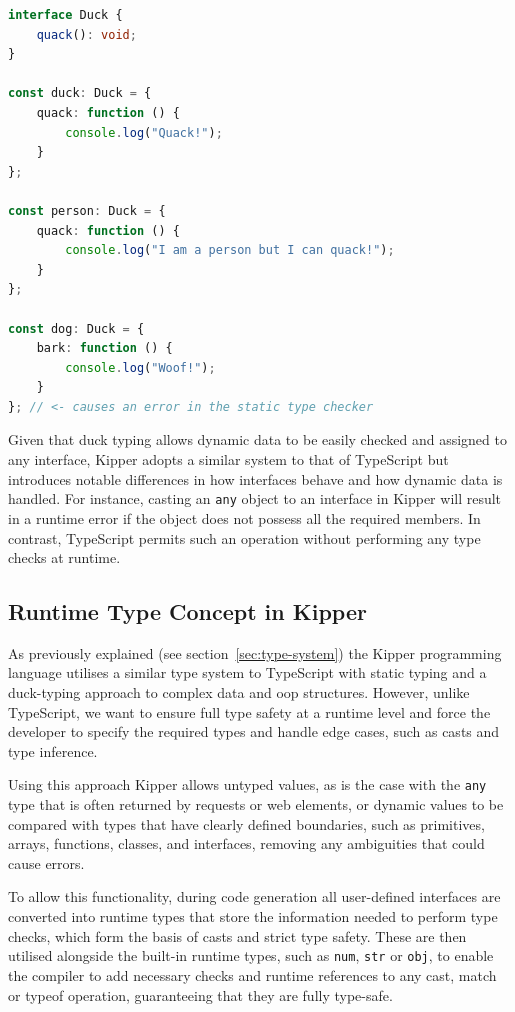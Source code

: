 \begin{lstlisting}[language=Typescript,caption=Example of duck typing in TypeScript,label=lst:implementation:javascriptducktyping]
interface Duck {
	quack(): void;
}

const duck: Duck = {
	quack: function () {
		console.log("Quack!");
	}
};

const person: Duck = {
	quack: function () {
		console.log("I am a person but I can quack!");
	}
};

const dog: Duck = {
	bark: function () {
		console.log("Woof!");
	}
}; // <- causes an error in the static type checker
\end{lstlisting}

Given that duck typing allows dynamic data to be easily checked and assigned to any interface, Kipper adopts a similar system to that of TypeScript but introduces notable differences in how interfaces behave and how dynamic data is handled. For instance, casting an \lstinline|any| object to an interface in Kipper will result in a runtime error if the object does not possess all the required members. In contrast, TypeScript permits such an operation without performing any type checks at runtime.

\subsection{Runtime Type Concept in Kipper}

As previously explained (see section~\ref{sec:type-system}) the Kipper programming language utilises a similar type system to TypeScript with static typing and a duck-typing approach to complex data and \acrshort{oop} structures. However, unlike TypeScript, we want to ensure full type safety at a runtime level and force the developer to specify the required types and handle edge cases, such as casts and type inference.

Using this approach Kipper allows untyped values, as is the case with the \lstinline|any| type that is often returned by requests or web elements, or dynamic values to be compared with types that have clearly defined boundaries, such as primitives, arrays, functions, classes, and interfaces, removing any ambiguities that could cause errors.

To allow this functionality, during code generation all user-defined interfaces are converted into runtime types that store the information needed to perform type checks, which form the basis of casts and strict type safety. These are then utilised alongside the built-in runtime types, such as \lstinline|num|, \lstinline|str| or \lstinline|obj|, to enable the compiler to add necessary checks and runtime references to any cast, match or typeof operation, guaranteeing that they are fully type-safe.


